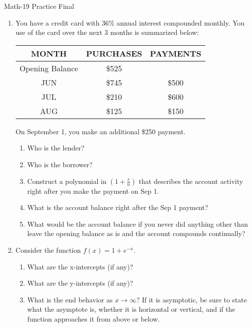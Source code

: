\documentclass[letterpaper,12pt,fleqn]{article}
\begin{document}
\begin{center}
\Large Math-19 Practice Final
\end{center}

\vspace{0.25in}

\begin{enumerate}

\item You have a credit card with 36\% annual interest compounded monthly.
You use of the card over the next 3 months is summarized below:

\begin{tabular}{|c|c|c|}
\hline
MONTH & PURCHASES & PAYMENTS \\
\hline
Opening Balance & \$525 & \\
\hline
JUN & \$745 & \$500 \\
\hline
JUL & \$210 & \$600 \\
\hline
AUG & \$125 & \$150 \\
\hline
\end{tabular}

On September 1, you make an additional \$250 payment.

\begin{enumerate}
\item Who is the lender?

\item Who is the borrower?

\item Construct a polynomial in $(1+\frac{r}{n})$ that describes the account
activity right after you make the payment on Sep 1.

\item What is the account balance right after the Sep 1 payment?

\item What would be the account balance if you never did anything other than
leave the opening balance as is and the account compounds continually?
\end{enumerate}

\item Consider the function $f(x)=1+e^{-x}$.

\begin{enumerate}
\item What are the x-intercepts (if any)?

\item What are the y-intercepts (if any)?

\item What is the end behavior as $x\to\infty$?  If it is asymptotic, be sure
to state what the asymptote is, whether it is horizontal or vertical, and if
the function approaches it from above or below.


\end{enumerate}
\end{enumerate}
\end{document}
